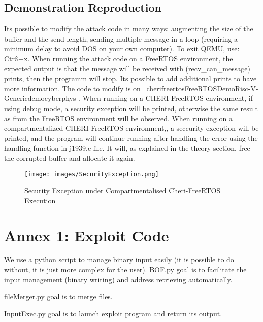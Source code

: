 \documentclass[a4paper, 11pt]{article}
\begin{document}
\subsection{Demonstration Reproduction}


Its possible to modify the attack code in many ways: augmenting the size of the buffer and the send length, sending multiple message in a loop (requiring a minimum delay to avoid DOS on your own computer).
To exit QEMU, use: Ctr\^a+x.
When running the attack code on a FreeRTOS environment, the expected output is that the message will be received with (recv\_can\_message) prints, then the programm will stop. Its possible to add additional prints to have more information. The code to modify is on ~\/cheri\/freertos\/FreeRTOS\/Demo\/Risc-V-Generic\/demo\/cyberphys\/ .
When running on a CHERI-FreeRTOS environment, if using debug mode, a security exception will be printed, otherwise the same result as from the FreeRTOS environment will be observed.
When running on a compartmentalized CHERI-FreeRTOS environment,, a seccurity exception will be printed, and the program will continue running after handling the error using the handling function in j1939.c file. It will, as explained in the theory section, free the corrupted buffer and allocate it again.
\begin{figure}[h!]
	\centering
	\texttt{[image: images/SecurityException.png]}
	\caption{Security Exception under Compartmentalised Cheri-FreeRTOS Execution}
	\label{sec:cyberphys-error}
\end{figure}
\clearpage 



\clearpage 
\appendix
\section{Annex 1: Exploit Code}


We use a python script to manage binary input easily (it is possible to do without, it is just more complex for the user). 
BOF.py goal is to facilitate the input management (binary writing) and address retrieving automatically.

fileMerger.py goal is to merge files.

InputExec.py goal is to launch exploit program and return its output.

\end{document}

